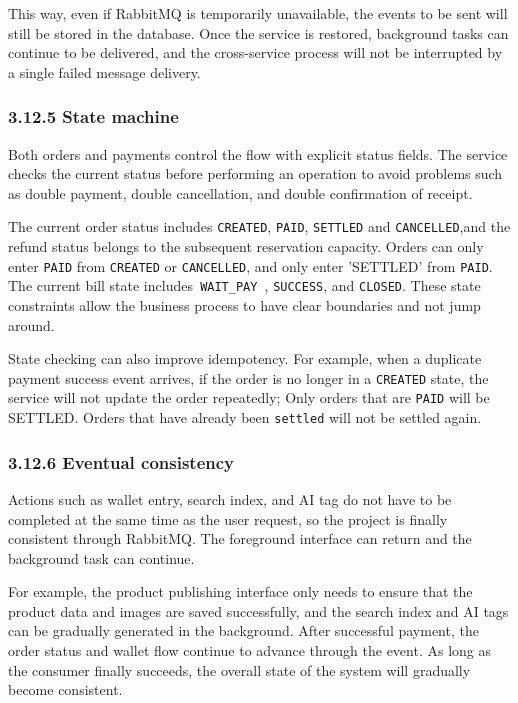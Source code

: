 \documentclass{article}
\begin{document}
This way, even if RabbitMQ is temporarily unavailable, the events to be sent will still be stored in the database. Once the service is restored, background tasks can continue to be delivered, and the cross-service process will not be interrupted by a single failed message delivery.

\subsubsection{3.12.5 State machine}

Both orders and payments control the flow with explicit status fields. The service checks the current status before performing an operation to avoid problems such as double payment, double cancellation, and double confirmation of receipt.

The current order status includes \texttt{CREATED}, \texttt{PAID}, \texttt{SETTLED} and \texttt{CANCELLED},and the refund status belongs to the subsequent reservation capacity. Orders can only enter \texttt{PAID} from \texttt{CREATED} or \texttt{CANCELLED}, and only enter 'SETTLED' from \texttt{PAID}. The current bill state includes\texttt{ WAIT\_PAY }, \texttt{SUCCESS}, and \texttt{CLOSED}. These state constraints allow the business process to have clear boundaries and not jump around.

State checking can also improve idempotency. For example, when a duplicate payment success event arrives, if the order is no longer in a \texttt{CREATED} state, the service will not update the order repeatedly; Only orders that are \texttt{PAID} will be SETTLED. Orders that have already been \texttt{settled} will not be settled again.

\subsubsection{3.12.6 Eventual consistency}

Actions such as wallet entry, search index, and AI tag do not have to be completed at the same time as the user request, so the project is finally consistent through RabbitMQ. The foreground interface can return and the background task can continue.

For example, the product publishing interface only needs to ensure that the product data and images are saved successfully, and the search index and AI tags can be gradually generated in the background. After successful payment, the order status and wallet flow continue to advance through the event. As long as the consumer finally succeeds, the overall state of the system will gradually become consistent.
\end{document}
